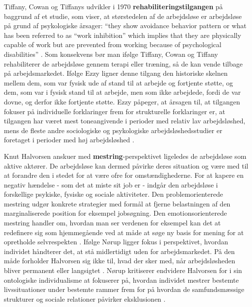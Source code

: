 Tiffany, Cowan og Tiffanys udvikler i 1970 \textbf{rehabiliteringstilgangen} på baggrund af et studie, som viser, at størstedelen af de arbejdsløse er arbejdsløse på grund af psykologiske årsager: “they show avoidance behavior pattern or what has been referred to as “work inhibition” which implies that they are physically capable of work but are prevented from working because of psychological disabilities” \parencite[43]{Ezzy1993}. Som konsekvens bør man ifølge Tiffany, Cowan og Tiffany rehabiliterer de arbejdsløse gennem terapi eller træning, så de kan vende tilbage på arbejdsmarkedet. Ifølge Ezzy ligner denne tilgang den historiske skelnen mellem dem, som var fysisk ude af stand til at arbejde og fortjente støtte, og dem, som var i fysisk stand til at arbejde, men som ikke arbejdede, fordi de var dovne, og derfor ikke fortjente støtte. %
Ezzy påpeger, at årsagen til, at tilgangen fokuser på individuelle forklaringer frem for strukturelle forklaringer er, at tilgangen har været mest toneangivende i perioder med relativ lav arbejdsløshed, mens de fleste andre sociologiske og psykologiske arbejdsløshedsstudier er foretaget i perioder med høj arbejdsløshed \parencite[43]{Ezzy1993}.
 
Knut Halvorsen anskuer med \textbf{mestring}-perspektivet ligeledes de arbejdsløse som aktive aktører. De arbejdsløse kan dermed påvirke deres situation og være med til at forandre den i stedet for at være ofre for omstændighederne. For at kapere en negativ hændelse - som det at miste sit job er - indgår den arbejdsløse i forskellige psykiske, fysiske og sociale aktiviteter. Den problemorienterede mestring udgør konkrete strategier med formål at fjerne belastningen af den marginaliserede position for eksempel jobsøgning. Den emotionsorienterede mestring handler om, hvordan man ser verdenen for eksempel kan det at redefinere sig som hjemmegående ved at måde at søge ny basis for mening for at opretholde selvrespekten \parencite[47]{Halvorsen1999}. Ifølge Nørup ligger fokus i perspektivet, hvordan individet håndterer det, at stå midlertidigt uden for arbejdsmarkedet. På den måde forholder Halvorsen sig ikke til, hvad der sker med, når arbejdsløsheden bliver permanent eller langsigtet \parencite[30]{Noerup2014}. Nørup kritiserer endvidere Halvorsen for i sin ontologiske individualisme at fokuserer på, hvordan individet mestrer bestemte livssituationer under bestemte rammer frem for på hvordan de samfundsmæssige strukturer og sociale relationer påvirker eksklusionen \parencite[37]{Noerup2014}.

